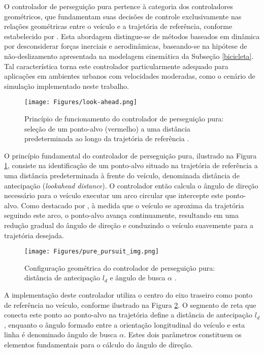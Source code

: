 O controlador de perseguição pura pertence à categoria dos controladores geométricos, que fundamentam suas decisões de controle exclusivamente nas relações geométricas entre o veículo e a trajetória de referência, conforme estabelecido por . Esta abordagem distingue-se de métodos baseados em dinâmica por desconsiderar forças inerciais e aerodinâmicas, baseando-se na hipótese de não-deslizamento apresentada na modelagem cinemática da Subseção \ref{bicicleta}. Tal característica torna este controlador particularmente adequado para aplicações em ambientes urbanos com velocidades moderadas, como o cenário de simulação implementado neste trabalho.

\begin{figure}[H]
\centering
\texttt{[image: Figures/look-ahead.png]}
\caption{Princípio de funcionamento do controlador de perseguição pura: seleção de um ponto-alvo (vermelho) a uma distância predeterminada ao longo da trajetória de referência \cite[Week 6 - Lesson 2: Geometric Lateral Control - Pure Pursuit. ~2min27s]{University_of_Toronto2018-fe}.}
\label{look-ahead}
\end{figure}

O princípio fundamental do controlador de perseguição pura, ilustrado na Figura \ref{look-ahead}, consiste na identificação de um ponto-alvo situado na trajetória de referência a uma distância predeterminada à frente do veículo, denominada distância de antecipação (\textit{lookahead distance}). O controlador então calcula o ângulo de direção necessário para o veículo executar um arco circular que intercepte este ponto-alvo. Como destacado por , à medida que o veículo se aproxima da trajetória seguindo este arco, o ponto-alvo avança continuamente, resultando em uma redução gradual do ângulo de direção e conduzindo o veículo suavemente para a trajetória desejada.

\begin{figure}[H]
\centering
\texttt{[image: Figures/pure\_pursuit\_img.png]}
\caption{Configuração geométrica do controlador de perseguição pura: distância de antecipação $l_d$ e ângulo de busca $\alpha$ \cite[Week 6 - Lesson 2: Geometric Lateral Control - Pure Pursuit. ~3min15s]{University_of_Toronto2018-fe}.}
\label{pure_pursuit_img}
\end{figure}

A implementação deste controlador utiliza o centro do eixo traseiro como ponto de referência no veículo, conforme ilustrado na Figura \ref{pure_pursuit_img}. O segmento de reta que conecta este ponto ao ponto-alvo na trajetória define a distância de antecipação $l_d$, enquanto o ângulo formado entre a orientação longitudinal do veículo e esta linha é denominado ângulo de busca $\alpha$. Estes dois parâmetros constituem os elementos fundamentais para o cálculo do ângulo de direção.

